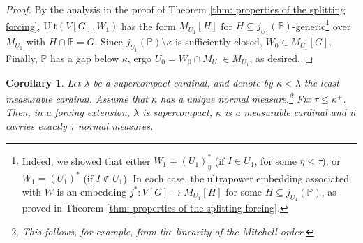 \documentclass[11pt]{amsart}
\newtheorem{corollary}[theorem]{Corollary}
\theoremstyle{definition}
\theoremstyle{remark}
\newcommand\<{{<}}
\newcommand{\po}{\mathbb{P}}
\begin{document}
\begin{proof}
       By the analysis in the proof of Theorem \ref{thm: properties of the splitting forcing}, $\text{Ult}(V[G], W_1)$ has the form $M_{U_1}[H]$ for $H\subseteq j_{U_1}(\po)$-generic\footnote{{Indeed, we showed that either  $W_1=(U_1)^*_\eta$ (if $I\in U_1$, for some $\eta<\tau$), or $W_1 = (U_1)^*$ (if $I\notin U_1$). In each case, the ultrapower embedding associated with $W$ is an embedding $j^*\colon V[G]\rightarrow M_{U_1}[H]$ for some $H\subseteq j_{U_1}(\po)$, as proved in Theorem \ref{thm: properties of the splitting forcing}.}} over $M_{U_1}$ with $H\cap \po = G$. 
       Since $j_{U_1}(\po)\setminus \kappa$ is sufficiently closed, $W_0 \in M_{U_1}[G]$. Finally,  $\po$ has a gap below $\kappa$, ergo $U_0 = W_0\cap M_{U_1}\in M_{U_1}$, as desired.
    \end{proof}

    \begin{corollary}
        Let $\lambda$ be a supercompact cardinal, and denote by $\kappa<\lambda$ the least measurable cardinal. Assume that $\kappa$ has a unique normal measure.\footnote{This follows, for example, from the linearity of the Mitchell order.} Fix $\tau\leq\kappa^{+}$. Then, in a forcing extension, $\lambda$ is supercompact, $\kappa$ is a measurable cardinal and it carries exactly $\tau$ normal measures.
    \end{corollary}
\end{document}
